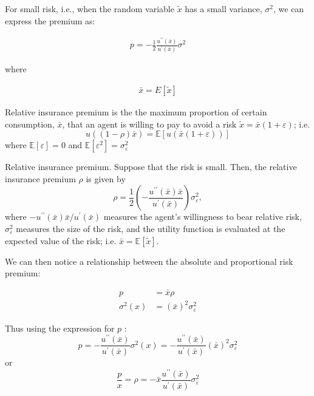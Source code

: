 \documentclass[10pt]{article}
\begin{document}
For small risk, i.e., 
when the random variable $\tilde{x}$ has a small variance, 
$\sigma^2$, we can express the premium as:

\begin{align}
    p=-\frac{1}{2} \frac{u^{\prime \prime}(\bar{x})}{u^{\prime}(\bar{x})} \sigma^2
\end{align}

where 

\begin{align}
    \bar{x}=E[\tilde{x}]
\end{align}


\begin{definition}
    Relative insurance premium is the the maximum proportion of certain consumption, $\bar{x}$, that an agent is willing to pay to avoid a risk $\tilde{x}=\bar{x}(1+\varepsilon)$; i.e.
    $$
    u((1-\rho) \bar{x})=\mathbb{E}[u(\bar{x}(1+\varepsilon))]
    $$
    where $\mathbb{E}[\varepsilon]=0$ and $\mathbb{E}\left[\varepsilon^2\right]=\sigma_{\varepsilon}^2$

\end{definition}

\begin{proposition}
    Relative insurance premium. Suppose that the risk is small. Then, the relative insurance premium $\rho$ is given by
    $$
    \rho=\frac{1}{2}\left(-\frac{u^{\prime \prime}(\bar{x}) \bar{x}}{u^{\prime}(\bar{x})}\right) \sigma_{\varepsilon}^2,
    $$
    where $-u^{\prime \prime}(\bar{x}) \bar{x} / u^{\prime}(\bar{x})$ measures the agent's willingness to bear relative risk, $\sigma_{\varepsilon}^2$ measures the size of the risk, and the utility function is evaluated at the expected value of the risk; i.e. $\bar{x}=\mathbb{E}[\tilde{x}]$.

\end{proposition}

We can then notice a relationship between the 
absolute and proportional risk premium:

\begin{align}
    p & =\bar{x} \rho \\
    \sigma^2(x) & =(\bar{x})^2 \sigma_{\varepsilon}^2
\end{align}

Thus using the expression for $p$ :
$$
p=-\frac{u^{\prime \prime}(\bar{x})}{u^{\prime}(\bar{x})} \sigma^2(x)=-\frac{u^{\prime \prime}(\bar{x})}{u^{\prime}(\bar{x})}(\bar{x})^2 \sigma_{\varepsilon}^2
$$
or
$$
\frac{p}{x}=\rho=-\bar{x} \frac{u^{\prime \prime}(\bar{x})}{u^{\prime}(\bar{x})} \sigma_{\varepsilon}^2
$$
\end{document}

